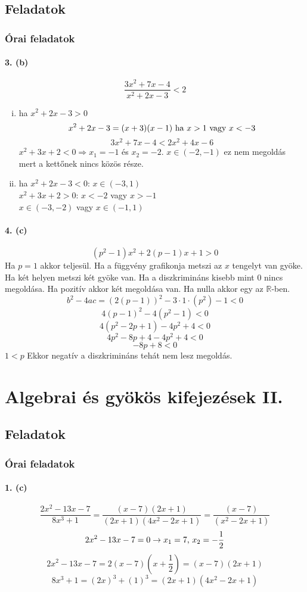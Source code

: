 \documentclass[12pt,a4paper,fleqn]{article}
\newcommand{\myparagraph}[1]{\paragraph{#1}\mbox{}}
\begin{document}
\subsection{Feladatok}
\subsubsection{Órai feladatok}


\myparagraph{3. (b)}
\[ \dfrac{3x^2+7x-4}{x^2+2x-3} < 2 \]
\begin{enumerate}[i.]
  \item ha $x^2+2x-3 > 0$
  \[ x^2+2x-3 = (x+3)(x-1)$ ha $x>1$ vagy $x<-3 \]
  \[ 3x^2+7x-4 < 2x^2+4x-6 \]
  $x^2 + 3x + 2 < 0 \Rightarrow x_1=-1$ és $x_2=-2$. $x \in (-2, -1)$ ez nem megoldás
  mert a kettőnek nincs közös része.
  \item ha $x^2+2x-3 < 0$: $x \in (-3, 1)$ \\
  $x^2+3x+2 > 0$: $x<-2$ vagy $x>-1$ \\
  $x \in (-3, -2)$ vagy $x \in (-1, 1)$
\end{enumerate}


\myparagraph{4. (c)}
\[ (p^2-1)x^2 + 2(p-1)x + 1 > 0 \]
Ha $p=1$ akkor teljesül.
Ha a függvény grafikonja metszi az $x$ tengelyt van gyöke. Ha két helyen metszi két gyöke van.
Ha a diszkrimináns kisebb mint 0 nincs megoldása. Ha pozitív akkor két megoldása van.
Ha nulla akkor egy az $\mathbb{R}$-ben.
\[ b^2-4ac=(2(p-1))^2-3 \cdot 1 \cdot (p^2)-1 < 0 \]
\[ 4(p-1)^2 - 4(p^2 - 1) < 0 \]
\[ 4(p^2 - 2p + 1) - 4p^2 + 4 < 0 \]
\[ 4p^2 - 8p + 4 - 4p^2 + 4 < 0 \]
\[ -8p + 8 < 0 \]
$ 1 < p $ Ekkor negatív a diszkrimináns tehát nem lesz megoldás.



\section{Algebrai és gyökös kifejezések II.}
\setcounter{subsection}{1}
\subsection{Feladatok}
\subsubsection{Órai feladatok}


\myparagraph{1. (c)}
\[ \dfrac{2x^2-13x-7}{8x^3+1} = \dfrac{(x-7)(2x+1)}{(2x+1)(4x^2-2x+1)} = \dfrac{(x-7)}{(x^2-2x+1)} \]
\[ 2x^2-13x-7=0 \rightarrow x_1 = 7$, $x_2 = -\dfrac{1}{2} \]
\[ 2x^2-13x-7=2(x-7)(x+\dfrac{1}{2})=(x-7)(2x+1) \]
\[ 8x^3 + 1 = (2x)^3 + (1)^3 = (2x+1)(4x^2-2x+1) \]
\end{document}
